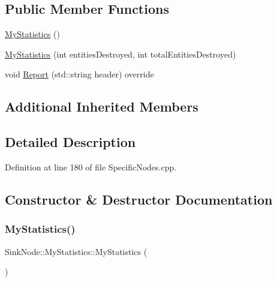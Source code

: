 \subsection*{Public Member Functions}
\begin{DoxyCompactItemize}
\item 
\hyperlink{class_sink_node_1_1_my_statistics_ab4e38f010b77fe552a89f4462ea70378}{My\+Statistics} ()
\item 
\hyperlink{class_sink_node_1_1_my_statistics_af8352a16e20eab800737612436be103e}{My\+Statistics} (int entities\+Destroyed, int total\+Entities\+Destroyed)
\item 
void \hyperlink{class_sink_node_1_1_my_statistics_acd304ae3a9892c9de454dc7ee36a942b}{Report} (std\+::string header) override
\end{DoxyCompactItemize}
\subsection*{Additional Inherited Members}


\subsection{Detailed Description}


Definition at line 180 of file Specific\+Nodes.\+cpp.



\subsection{Constructor \& Destructor Documentation}
\mbox{\label{class_sink_node_1_1_my_statistics_ab4e38f010b77fe552a89f4462ea70378}} 
\subsubsection{\texorpdfstring{My\+Statistics()}{MyStatistics()}\hspace{0.1cm}{\footnotesize\ttfamily [1/2]}}
{\footnotesize\ttfamily Sink\+Node\+::\+My\+Statistics\+::\+My\+Statistics (\begin{DoxyParamCaption}{ }\end{DoxyParamCaption})\hspace{0.3cm}{\ttfamily [inline]}}



